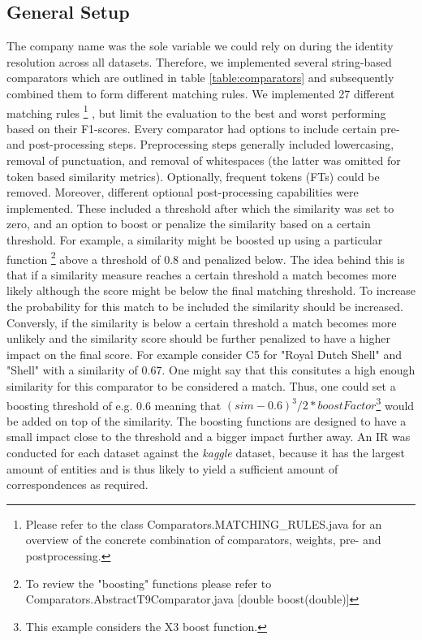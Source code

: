 \documentclass[11pt,titlepage,oneside,openany]{book}
\begin{document}
\subsection{General Setup}
The company name was the sole variable we could rely on during the identity resolution across all datasets. Therefore, we implemented several string-based comparators which are outlined in table \ref{table:comparators} and subsequently combined them to form different matching rules. We implemented 27 different matching rules%
\footnote{Please refer to the class Comparators.MATCHING\_RULES.java for an overview of the concrete combination of comparators, weights, pre- and postprocessing.}%
, but limit the evaluation to the best and worst performing based on their F1-scores.
Every comparator had options to include certain pre- and post-processing steps. Preprocessing steps generally included lowercasing, removal of punctuation, and removal of whitespaces (the latter was omitted for token based similarity metrics). Optionally, frequent tokens (FTs) could be removed. Moreover, different optional post-processing capabilities were implemented. These included a threshold after which the similarity was set to zero, and an option to boost or penalize the similarity based on a certain threshold. For example, a similarity might be boosted up using a particular function%
\footnote{To review the "boosting" functions please refer to Comparators.AbstractT9Comparator.java [double boost(double)]}%
 above a threshold of 0.8 and penalized below. The idea behind this is that if a similarity measure reaches a certain threshold a match becomes more likely although the score might be below the final matching threshold. To increase the probability for this match to be included the similarity should be increased. Conversly, if the similarity is below a certain threshold a match becomes more unlikely and the similarity score should be further penalized to have a higher impact on the final score. For example consider C5 for "Royal Dutch Shell" and "Shell" with a similarity of 0.67. One might say that this consitutes a high enough similarity for this comparator to be considered a match. Thus, one could set a boosting threshold of e.g. 0.6 meaning that $(sim - 0.6)^3/2*boostFactor$\footnote{This example considers the X3 boost function.} would be added on top of the similarity. The boosting functions are designed to have a small impact close to the threshold and a bigger impact further away. 
An IR was conducted for each dataset against the \textit{kaggle} dataset, because it has the largest amount of entities and is thus likely to yield a sufficient amount of correspondences as required.
\end{document}
